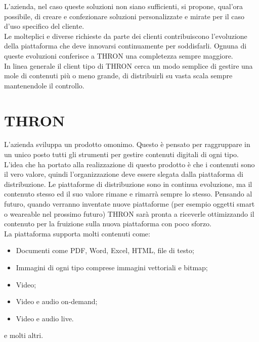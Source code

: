 \documentclass[a4paper, 12pt, twoside, openright]{book}
\begin{document}
L'azienda, nel caso queste soluzioni non siano sufficienti, si propone, qual'ora possibile, di creare e confezionare soluzioni personalizzate e mirate per il caso d'uso specifico del cliente.\\

Le molteplici e diverse richieste da parte dei clienti contribuiscono l'evoluzione della piattaforma che deve innovarsi continuamente per soddisfarli. Ognuna di queste evoluzioni conferisce a THRON una completezza sempre maggiore.\\

In linea generale il client tipo di THRON cerca un modo semplice di gestire una mole di contenuti più o meno grande, di distribuirli su vasta scala sempre mantenendole il controllo.\\

\newpage{}
\section{THRON}
L'azienda sviluppa un prodotto omonimo. Questo è pensato per raggruppare in un unico posto tutti gli strumenti per gestire contenuti digitali di ogni tipo.\\
L'idea che ha portato alla realizzazione di questo prodotto è che i contenuti sono il vero valore, quindi l'organizzazione deve essere slegata dalla piattaforma di distribuzione. Le piattaforme di distribuzione sono in continua evoluzione, ma il contenuto stesso ed il suo valore rimane e rimarrà sempre lo stesso. Pensando al futuro, quando verranno inventate nuove piattaforme (per esempio oggetti smart o weareable nel prossimo futuro) THRON sarà pronta a riceverle ottimizzando il contenuto per la fruizione sulla nuova piattaforma con poco sforzo.\\
La piattaforma supporta molti contenuti come:
\begin{itemize}
\item Documenti come PDF, Word, Excel, HTML, file di testo;
\item Immagini di ogni tipo comprese immagini vettoriali e bitmap;
\item Video;
\item Video e audio on-demand;
\item Video e audio live.
\end{itemize}
e molti altri.\\
\end{document}

